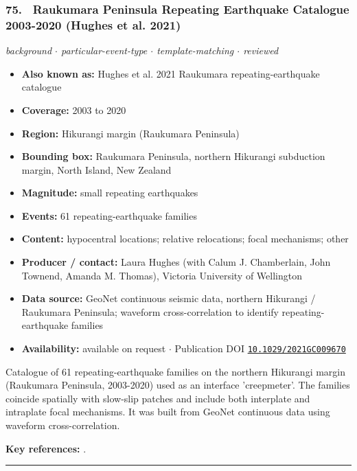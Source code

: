 \documentclass[10pt,a4paper]{article}
\newcommand{\catentryrule}{\par\vspace{3pt}\noindent\textcolor{rulegrey}{\rule{\linewidth}{0.3pt}}\par\vspace{5pt}}
\newcommand{\kv}[2]{\item \textbf{#1:} #2}
\begin{document}
\subsubsection*{\hypertarget{c:75}{75.}~ Raukumara Peninsula Repeating Earthquake Catalogue 2003-2020 (Hughes et al. 2021)}
{\small\itshape background $\cdot$ particular-event-type $\cdot$ template-matching $\cdot$ reviewed}\par\vspace{2pt}
\begin{itemize}[leftmargin=1.3em,itemsep=0.6pt,topsep=1pt,parsep=0pt]
\kv{Also known as}{Hughes et al. 2021 Raukumara repeating-earthquake catalogue}
\kv{Coverage}{2003 to 2020}
\kv{Region}{Hikurangi margin (Raukumara Peninsula)}
\kv{Bounding box}{Raukumara Peninsula, northern Hikurangi subduction margin, North Island, New Zealand}
\kv{Magnitude}{small repeating earthquakes}
\kv{Events}{61 repeating-earthquake families}
\kv{Content}{hypocentral locations; relative relocations; focal mechanisms; other}
\kv{Producer / contact}{Laura Hughes (with Calum J. Chamberlain, John Townend, Amanda M. Thomas), Victoria University of Wellington}
\kv{Data source}{GeoNet continuous seismic data, northern Hikurangi / Raukumara Peninsula; waveform cross-correlation to identify repeating-earthquake families}
\kv{Availability}{available on request $\cdot$ Publication DOI \href{https://doi.org/10.1029/2021GC009670}{\nolinkurl{10.1029/2021GC009670}}}
\end{itemize}
\par\vspace{2pt}Catalogue of 61 repeating-earthquake families on the northern Hikurangi margin (Raukumara Peninsula, 2003-2020) used as an interface 'creepmeter'. The families coincide spatially with slow-slip patches and include both interplate and intraplate focal mechanisms. It was built from GeoNet continuous data using waveform cross-correlation.
\par\vspace{2pt}\textbf{Key references:} \cite{Hughes2021}.
\catentryrule
\end{document}
